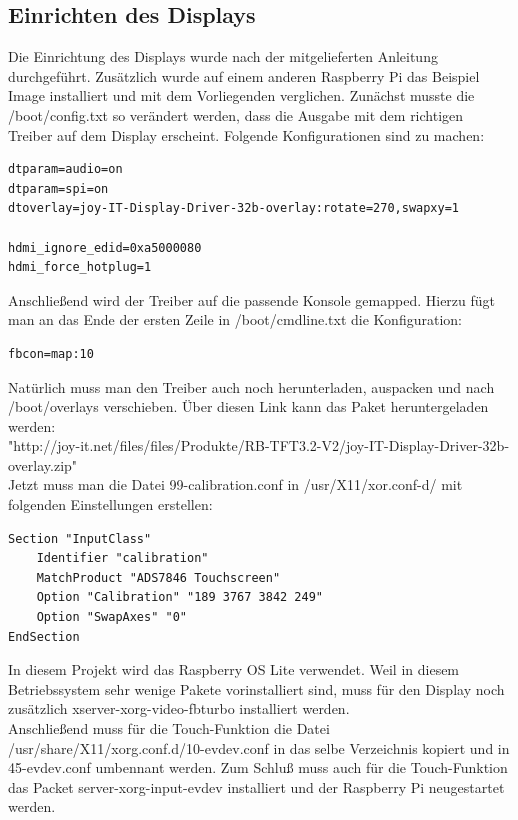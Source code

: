 \documentclass[a4paper,11pt,singlespacing]{article}
\begin{document}
    \subsection{Einrichten des Displays}
    		Die Einrichtung des Displays wurde nach der mitgelieferten Anleitung durchgeführt. \cite{Quote_display_manual} Zusätzlich wurde auf einem anderen Raspberry Pi das Beispiel Image installiert und mit dem Vorliegenden verglichen. Zunächst musste die /boot/config.txt so verändert werden, dass die Ausgabe mit dem richtigen Treiber auf dem Display erscheint. Folgende Konfigurationen sind zu machen:
    		\begin{lstlisting}
dtparam=audio=on
dtparam=spi=on
dtoverlay=joy-IT-Display-Driver-32b-overlay:rotate=270,swapxy=1

hdmi_ignore_edid=0xa5000080
hdmi_force_hotplug=1
    		\end{lstlisting}
    		
    		Anschließend wird der Treiber auf die passende Konsole gemapped. Hierzu fügt man an das Ende der ersten Zeile in /boot/cmdline.txt die Konfiguration:
    		\begin{lstlisting}
fbcon=map:10
    		\end{lstlisting}

			Natürlich muss man den Treiber auch noch herunterladen, auspacken und nach /boot/overlays verschieben. Über diesen Link kann das Paket heruntergeladen werden:\\
			
			"http://joy-it.net/files/files/Produkte/RB-TFT3.2-V2/joy-IT-Display-Driver-32b-overlay.zip" \\

    		Jetzt muss man die Datei 99-calibration.conf in /usr/X11/xor.conf-d/ mit folgenden Einstellungen erstellen:
    		\begin{lstlisting}
Section "InputClass"
	Identifier "calibration"
	MatchProduct "ADS7846 Touchscreen"
	Option "Calibration" "189 3767 3842 249"
	Option "SwapAxes" "0"
EndSection
    		\end{lstlisting}
 
			In diesem Projekt wird das Raspberry OS Lite verwendet. Weil in diesem Betriebssystem sehr wenige Pakete vorinstalliert sind, muss für den Display noch zusätzlich xserver-xorg-video-fbturbo installiert werden. \\
			Anschließend muss für die Touch-Funktion die Datei /usr/share/X11/xorg.conf.d/10-evdev.conf in das selbe Verzeichnis kopiert und in 45-evdev.conf umbennant werden. Zum Schluß muss auch für die Touch-Funktion das Packet server-xorg-input-evdev installiert und der Raspberry Pi neugestartet werden.
\end{document}
